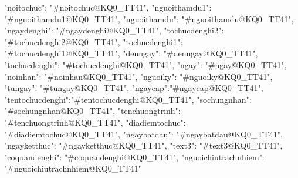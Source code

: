 {
                "noitochuc": "#noitochuc@KQ0_TT41",
                "nguoithamdu1": "#nguoithamdu1@KQ0_TT41",
                "nguoithamdu": "#nguoithamdu@KQ0_TT41",
                "ngaydenghi": "#ngaydenghi@KQ0_TT41",
                "tochucdenghi2": "#tochucdenghi2@KQ0_TT41",
                "tochucdenghi1": "#tochucdenghi1@KQ0_TT41",
                "denngay": "#denngay@KQ0_TT41",
                "tochucdenghi": "#tochucdenghi@KQ0_TT41",
                "ngay": "#ngay@KQ0_TT41",
                "noinhan": "#noinhan@KQ0_TT41",
                "nguoiky": "#nguoiky@KQ0_TT41",
                "tungay": "#tungay@KQ0_TT41",
                "ngaycap":"#ngaycap@KQ0_TT41",
                "tentochucdenghi":"#tentochucdenghi@KQ0_TT41",
                "sochungnhan": "#sochungnhan@KQ0_TT41",
                "tenchuongtrinh": "#tenchuongtrinh@KQ0_TT41",
                "diadiemtochuc": "#diadiemtochuc@KQ0_TT41",
                "ngaybatdau": "#ngaybatdau@KQ0_TT41",
                "ngayketthuc": "#ngayketthuc@KQ0_TT41",
                "text3": "#text3@KQ0_TT41",
                "coquandenghi": "#coquandenghi@KQ0_TT41",
                "nguoichiutrachnhiem": "#nguoichiutrachnhiem@KQ0_TT41"

            }